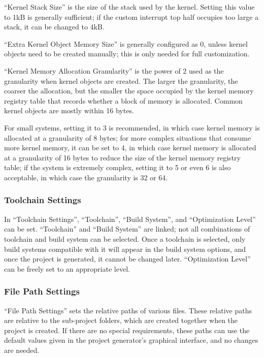 ``Kernel Stack Size'' is the size of the stack used by the kernel. Setting this value to 1kB is generally sufficient; if the custom interrupt top half occupies too large a stack, it can be changed to 4kB.

``Extra Kernel Object Memory Size'' is generally configured as 0, unless kernel objects need to be created manually; this is only needed for full customization.

``Kernel Memory Allocation Granularity'' is the power of 2 used as the granularity when kernel objects are created. The larger the granularity, the coarser the allocation, but the smaller the space occupied by the kernel memory registry table that records whether a block of memory is allocated. Common kernel objects are mostly within 16 bytes.

For small systems, setting it to 3 is recommended, in which case kernel memory is allocated at a granularity of 8 bytes; for more complex situations that consume more kernel memory, it can be set to 4, in which case kernel memory is allocated at a granularity of 16 bytes to reduce the size of the kernel memory registry table; if the system is extremely complex, setting it to 5 or even 6 is also acceptable, in which case the granularity is 32 or 64.

\subsubsection{Toolchain Settings}\label{subsubsec:6-5-2-3}

In ``Toolchain Settings'', ``Toolchain'', ``Build System'', and ``Optimization Level'' can be set. ``Toolchain'' and ``Build System'' are linked; not all combinations of toolchain and build system can be selected. Once a toolchain is selected, only build systems compatible with it will appear in the build system options, and once the project is generated, it cannot be changed later. ``Optimization Level'' can be freely set to an appropriate level.

\subsubsection{File Path Settings}\label{subsubsec:6-5-2-4}

``File Path Settings'' sets the relative paths of various files. These relative paths are relative to the sub-project folders, which are created together when the project is created. If there are no special requirements, these paths can use the default values given in the project generator's graphical interface, and no changes are needed.

